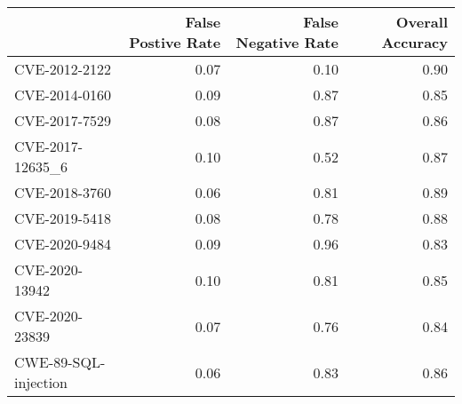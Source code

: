 \begin{tabular}{lrrr}
\toprule
{} &  False Postive Rate &  False Negative Rate &  Overall Accuracy \\
\midrule
CVE-2012-2122        &                0.07 &                 0.10 &              0.90 \\
CVE-2014-0160        &                0.09 &                 0.87 &              0.85 \\
CVE-2017-7529        &                0.08 &                 0.87 &              0.86 \\
CVE-2017-12635\_6     &                0.10 &                 0.52 &              0.87 \\
CVE-2018-3760        &                0.06 &                 0.81 &              0.89 \\
CVE-2019-5418        &                0.08 &                 0.78 &              0.88 \\
CVE-2020-9484        &                0.09 &                 0.96 &              0.83 \\
CVE-2020-13942       &                0.10 &                 0.81 &              0.85 \\
CVE-2020-23839       &                0.07 &                 0.76 &              0.84 \\
CWE-89-SQL-injection &                0.06 &                 0.83 &              0.86 \\
\bottomrule
\end{tabular}
